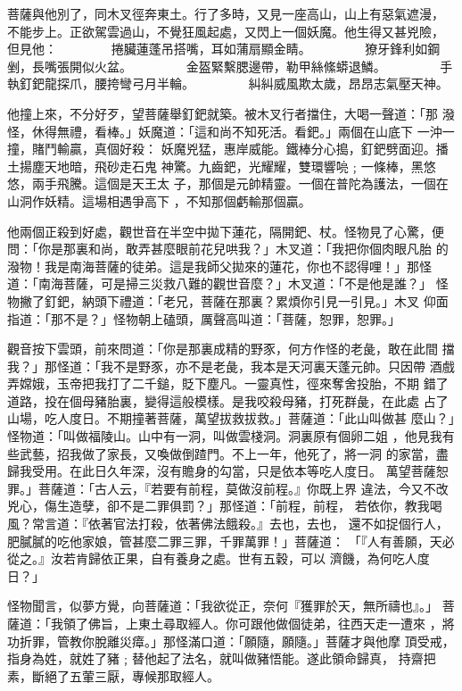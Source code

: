 \begin{pinyinscope}
{菩薩與他別了，同木叉徑奔東土。行了多時，又見一座高山，山上有惡氣遮漫，
不能步上。正欲駕雲過山，不覺狂風起處，又閃上一個妖魔。他生得又甚兇險，
但見他：
　　　　捲臟蓮蓬吊搭嘴，耳如蒲扇顯金睛。
　　　　獠牙鋒利如鋼剉，長嘴張開似火盆。
　　　　金盔緊繫腮邊帶，勒甲絲絛蟒退鱗。
　　　　手執釘鈀龍探爪，腰挎彎弓月半輪。
　　　　糾糾威風欺太歲，昂昂志氣壓天神。

他撞上來，不分好歹，望菩薩舉釘鈀就築。被木叉行者擋住，大喝一聲道：「那
潑怪，休得無禮，看棒。」妖魔道：「這和尚不知死活。看鈀。」兩個在山底下
一沖一撞，賭鬥輸贏，真個好殺：
妖魔兇猛，惠岸威能。鐵棒分心搗，釘鈀劈面迎。播土揚塵天地暗，飛砂走石鬼
神驚。九齒鈀，光耀耀，雙環響喨﹔一條棒，黑悠悠，兩手飛騰。這個是天王太
子，那個是元帥精靈。一個在普陀為護法，一個在山洞作妖精。這場相遇爭高下
，不知那個虧輸那個贏。

他兩個正殺到好處，觀世音在半空中拋下蓮花，隔開鈀、杖。怪物見了心驚，便
問：「你是那裏和尚，敢弄甚麼眼前花兒哄我？」木叉道：「我把你個肉眼凡胎
的潑物！我是南海菩薩的徒弟。這是我師父拋來的蓮花，你也不認得哩！」那怪
道：「南海菩薩，可是掃三災救八難的觀世音麼？」木叉道：「不是他是誰？」
怪物撇了釘鈀，納頭下禮道：「老兄，菩薩在那裏？累煩你引見一引見。」木叉
仰面指道：「那不是？」怪物朝上磕頭，厲聲高叫道：「菩薩，恕罪，恕罪。」

觀音按下雲頭，前來問道：「你是那裏成精的野豕，何方作怪的老彘，敢在此間
擋我？」那怪道：「我不是野豕，亦不是老彘，我本是天河裏天蓬元帥。只因帶
酒戲弄嫦娥，玉帝把我打了二千鎚，貶下塵凡。一靈真性，徑來奪舍投胎，不期
錯了道路，投在個母豬胎裏，變得這般模樣。是我咬殺母豬，打死群彘，在此處
占了山場，吃人度日。不期撞著菩薩，萬望拔救拔救。」菩薩道：「此山叫做甚
麼山？」怪物道：「叫做福陵山。山中有一洞，叫做雲棧洞。洞裏原有個卵二姐
，他見我有些武藝，招我做了家長，又喚做倒蹅門。不上一年，他死了，將一洞
的家當，盡歸我受用。在此日久年深，沒有贍身的勾當，只是依本等吃人度日。
萬望菩薩恕罪。」菩薩道：「古人云，『若要有前程，莫做沒前程。』你既上界
違法，今又不改兇心，傷生造孽，卻不是二罪俱罰？」那怪道：「前程，前程，
若依你，教我喝風？常言道：『依著官法打殺，依著佛法餓殺。』去也，去也，
還不如捉個行人，肥膩膩的吃他家娘，管甚麼二罪三罪，千罪萬罪！」菩薩道：
「『人有善願，天必從之。』汝若肯歸依正果，自有養身之處。世有五穀，可以
濟饑，為何吃人度日？」

怪物聞言，似夢方覺，向菩薩道：「我欲從正，奈何『獲罪於天，無所禱也』。」
菩薩道：「我領了佛旨，上東土尋取經人。你可跟他做個徒弟，往西天走一遭來
，將功折罪，管教你脫離災瘴。」那怪滿口道：「願隨，願隨。」菩薩才與他摩
頂受戒，指身為姓，就姓了豬﹔替他起了法名，就叫做豬悟能。遂此領命歸真，
持齋把素，斷絕了五葷三厭，專候那取經人。

}
\end{pinyinscope}
